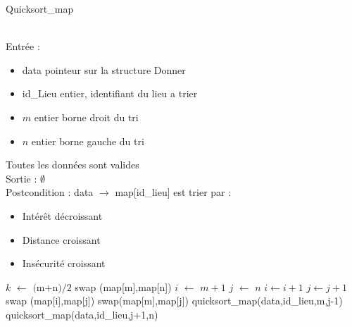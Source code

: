 \documentclass[UTF8]{EPURapport}
\begin{document}
\begin{algorithm}
\caption{Quicksort\_map}
\label{Quicksort_map}
\begin{algorithmic}[1]
\REQUIRE  ~\\
Entrée : \begin{itemize}
\item data pointeur sur la structure Donner\\
\item id\_Lieu entier, identifiant du lieu a trier\\
\item $m$ entier borne droit du tri\\
\item $n$ entier  borne gauche du tri\\
\end{itemize}
Toutes les données sont valides
\ENSURE ~\\
Sortie : $\emptyset$ \\
Postcondition : data  $\to$ map[id\_lieu] est trier par : \begin{itemize}
\item Intérêt décroissant
\item Distance croissant
\item Insécurité croissant
\end{itemize}
   \STATE $k$ $\gets$ $($m$+$n$)/2$
   \STATE swap (map[m],map[n])
   \STATE $i$ $\gets$ $m+1$
   \STATE $j$ $\gets$ $n$
   \STATE $i \gets i+1$
        \ENDWHILE
            \STATE $j \gets j+1$
        \ENDWHILE
          \STATE swap (map[i],map[j])
        \ENDIF
   \ENDWHILE     
        \STATE swap(map[m],map[j])
        \STATE quicksort\_map(data,id\_lieu,m,j-1)
        \STATE quicksort\_map(data,id\_lieu,j+1,n)
\ENDIF
\end{algorithmic}
\end{algorithm}
\end{document}
